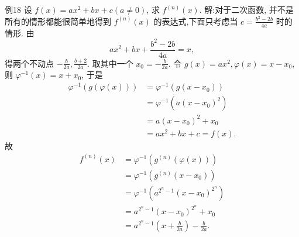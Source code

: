 例18 设 $f(x)=a x^2+b x+c(a \neq 0)$, 求 $f^{(n)}(x)$.
解:对于二次函数, 并不是所有的情形都能很简单地得到 $f^{(n)}(x)$ 的表达式,下面只考虑当 $c=\frac{b^2-2 b}{4 a}$ 时的情形.
由
$$
a x^2+b x+\frac{b^2-2 b}{4 a}=x,
$$
得两个不动点 $-\frac{b}{2 a}, \frac{b+2}{2 a}$. 取其中一个 $x_0=-\frac{b}{2 a}$.
令 $g(x)=a x^2, \varphi(x)=x-x_0$, 则 $\varphi^{-1}(x)=x+x_0$, 于是
$$
\begin{aligned}
\varphi^{-1}(g(\varphi(x))) & =\varphi^{-1}\left(g\left(x-x_0\right)\right) \\
& =\varphi^{-1}\left(a\left(x-x_0\right)^2\right) \\
& =a\left(x-x_0\right)^2+x_0 \\
& =a x^2+b x+c=f(x) .
\end{aligned}
$$
故
$$
\begin{aligned}
f^{(n)}(x) & =\varphi^{-1}\left(g^{(n)}(\varphi(x))\right) \\
& =\varphi^{-1}\left(g^{(n)}\left(x-x_0\right)\right) \\
& =\varphi^{-1}\left(a^{2^n-1}\left(x-x_0\right)^{2^n}\right) \\
& =a^{2^n-1}\left(x-x_0\right)^{2^n}+x_0 \\
& =a^{2^n-1}\left(x+\frac{b}{2 a}\right)-\frac{b}{2 a} .
\end{aligned}
$$



